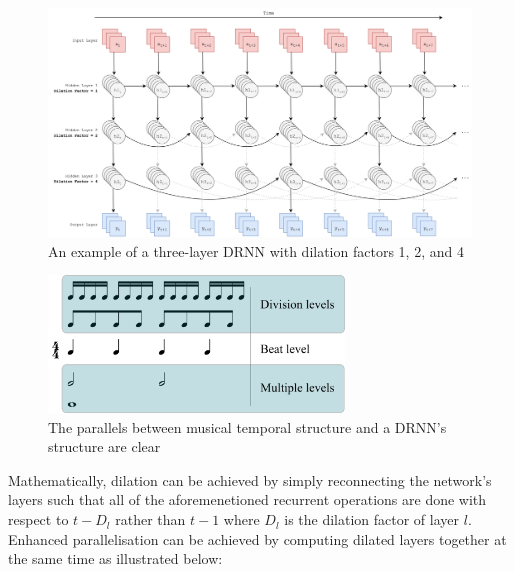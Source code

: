 \documentclass[12pt,]{article}
\begin{document}
\begin{figure}
\centering
\includegraphics[width=1\textwidth,height=\textheight]{Images/dilatedrnn.png}
\caption{An example of a three-layer DRNN with dilation factors 1, 2,
and 4}
\end{figure}

\begin{figure}
\centering
\includegraphics[width=0.7\textwidth,height=\textheight]{Images/Metric_levels.png}
\caption{The parallels between musical temporal structure and a DRNN's
structure are clear}
\end{figure}

Mathematically, dilation can be achieved by simply reconnecting the
network's layers such that all of the aforemenetioned recurrent
operations are done with respect to \(t-D_l\) rather than \(t-1\) where
\(D_l\) is the dilation factor of layer \(l\). Enhanced parallelisation
can be achieved by computing dilated layers together at the same time as
illustrated below:
\end{document}
